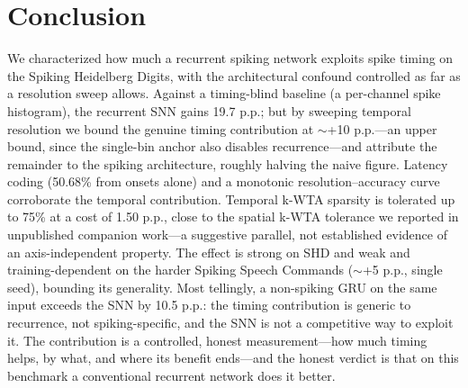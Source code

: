 \documentclass[11pt]{article}
\begin{document}
\section{Conclusion}
\label{sec:conclusion}

We characterized how much a recurrent spiking network exploits spike timing on the Spiking Heidelberg Digits, with the architectural confound controlled as far as a resolution sweep allows. Against a timing-blind baseline (a per-channel spike histogram), the recurrent SNN gains 19.7 p.p.; but by sweeping temporal resolution we bound the genuine timing contribution at $\sim$+10 p.p.---an upper bound, since the single-bin anchor also disables recurrence---and attribute the remainder to the spiking architecture, roughly halving the naive figure. Latency coding (50.68\% from onsets alone) and a monotonic resolution--accuracy curve corroborate the temporal contribution. Temporal k-WTA sparsity is tolerated up to 75\% at a cost of 1.50 p.p., close to the spatial k-WTA tolerance we reported in unpublished companion work---a suggestive parallel, not established evidence of an axis-independent property. The effect is strong on SHD and weak and training-dependent on the harder Spiking Speech Commands ($\sim$+5 p.p., single seed), bounding its generality. Most tellingly, a non-spiking GRU on the same input exceeds the SNN by 10.5 p.p.: the timing contribution is generic to recurrence, not spiking-specific, and the SNN is not a competitive way to exploit it. The contribution is a controlled, honest measurement---how much timing helps, by what, and where its benefit ends---and the honest verdict is that on this benchmark a conventional recurrent network does it better.


\end{document}
